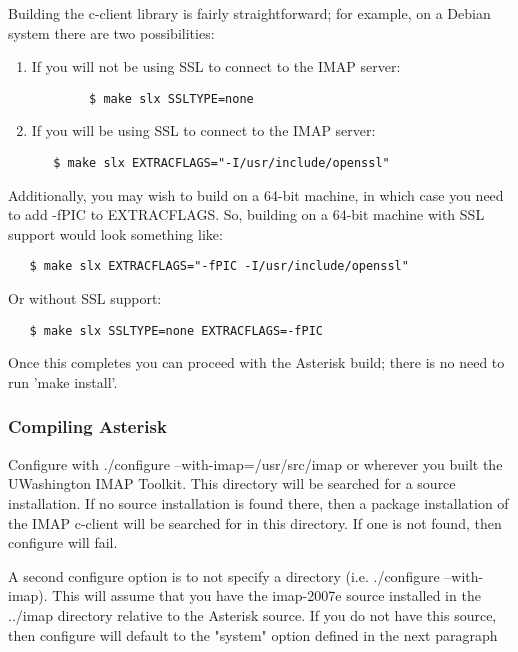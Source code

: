 Building the c-client library is fairly straightforward; for example, on a
Debian system there are two possibilities:

\begin{enumerate}
    \item If you will not be using SSL to connect to the IMAP server:
   \begin{verbatim}
        $ make slx SSLTYPE=none
   \end{verbatim}
    \item If you will be using SSL to connect to the IMAP server:
   \begin{verbatim}
   $ make slx EXTRACFLAGS="-I/usr/include/openssl"
   \end{verbatim}
\end{enumerate}

Additionally, you may wish to build on a 64-bit machine, in which case you
need to add -fPIC to EXTRACFLAGS. So, building on a 64-bit machine with
SSL support would look something like:

\begin{verbatim}
   $ make slx EXTRACFLAGS="-fPIC -I/usr/include/openssl"
\end{verbatim}

Or without SSL support:

\begin{verbatim}
   $ make slx SSLTYPE=none EXTRACFLAGS=-fPIC
\end{verbatim}

Once this completes you can proceed with the Asterisk build; there is no
need to run 'make install'.

\subsubsection{Compiling Asterisk}

Configure with ./configure --with-imap=/usr/src/imap
or wherever you built the UWashington IMAP Toolkit. This directory
will be searched for a source installation. If no source installation is
found there, then a package installation of the IMAP c-client will be 
searched for in this directory. If one is not found, then configure will fail.

A second configure option is to not specify a directory (i.e.
./configure --with-imap). This will assume that you have the
imap-2007e source installed in the ../imap directory relative to the
Asterisk source. If you do not have this source, then configure will
default to the "system" option defined in the next paragraph

